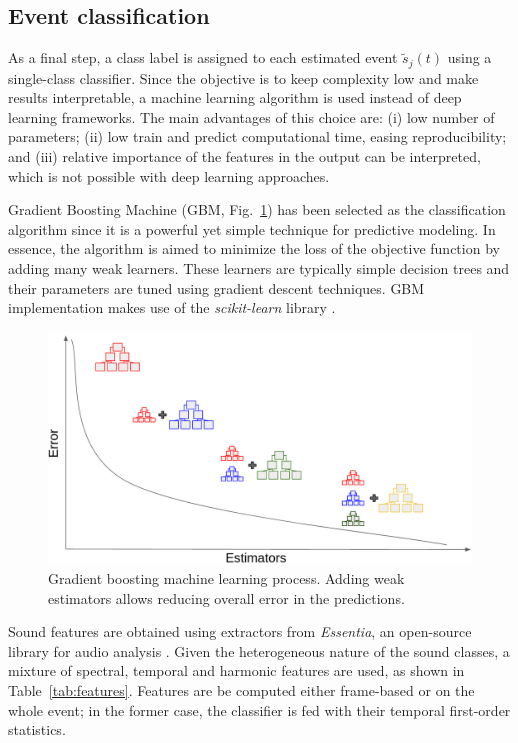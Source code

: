 \subsection{Event classification}
As a final step, a class label is assigned to each estimated event $\tilde{s}_j(t)$ using a single-class classifier. Since the objective is to keep complexity low and make results interpretable, a machine learning algorithm is used instead of deep learning frameworks. The main advantages of this choice are: (i) low number of parameters; (ii) low train and predict computational time, easing reproducibility; and (iii) relative importance of the features in the output can be interpreted, which is not possible with deep learning approaches.

Gradient Boosting Machine (GBM, Fig.~\ref{fig:gbm}) has been selected as the classification algorithm since it is a powerful yet simple technique for predictive modeling. 
In essence, the algorithm is aimed to minimize the loss of the objective function by adding many weak learners. These learners are typically simple decision trees and their parameters are tuned using gradient descent techniques. 
GBM implementation makes use of the \textit{scikit-learn} library \cite{scikit-learn}.

\begin{figure}[t]
  \centering
  \centerline{\includegraphics[width=0.75\columnwidth]{Figures/SELD/gbm.png}}
  \caption{Gradient boosting machine learning process. Adding weak estimators allows reducing overall error in the predictions.}
  \label{fig:gbm}
\end{figure}

Sound features are obtained using extractors from \textit{Essentia}, an open-source library for audio analysis \cite{bogdanov2013essentia}. 
Given the heterogeneous nature of the sound classes, a mixture of spectral, temporal and harmonic features are used, as shown in Table~\ref{tab:features}. 
Features are be computed either frame-based or on the whole event; in the former case, the classifier is fed with their temporal first-order statistics. 



